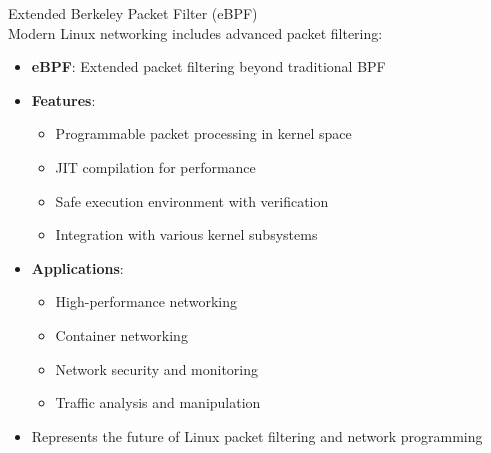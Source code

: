 \begin{definition}{Extended Berkeley Packet Filter (eBPF)}\\
    Modern Linux networking includes advanced packet filtering:
    \begin{itemize}
        \item \textbf{eBPF}: Extended packet filtering beyond traditional BPF
        \item \textbf{Features}:
            \begin{itemize}
                \item Programmable packet processing in kernel space
                \item JIT compilation for performance
                \item Safe execution environment with verification
                \item Integration with various kernel subsystems
            \end{itemize}
        \item \textbf{Applications}:
            \begin{itemize}
                \item High-performance networking
                \item Container networking
                \item Network security and monitoring
                \item Traffic analysis and manipulation
            \end{itemize}
        \item Represents the future of Linux packet filtering and network programming
    \end{itemize}
\end{definition}

